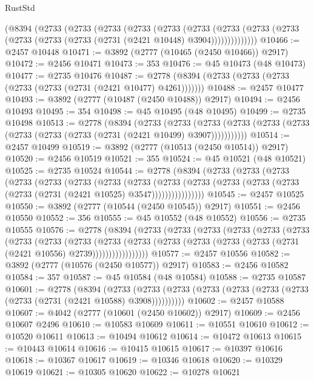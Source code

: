 \begin{lexlean}{RustStd}
\begin{coremodule}
    (@8394
      (@2733
        (@2733
          (@2733
            (@2733
              (@2733
                (@2733
                  (@2733
                    (@2733 (@2733 (@2733 (@2733 (@2733 (@2731 (@2421 @10448) @3904))))))))))))))
@10466 := @2457 @10448
@10471 := @3892 (@2777 (@10465 (@2450 @10466)) @2917)
@10472 := @2456 @10471
@10473 := 353
@10476 := @45 @10473 (@48 @10473)
@10477 := @2735 @10476
@10487 := @2778 (@8394 (@2733 (@2733 (@2733 (@2733 (@2733 (@2731 (@2421 @10477) @4261)))))))
@10488 := @2457 @10477
@10493 := @3892 (@2777 (@10487 (@2450 @10488)) @2917)
@10494 := @2456 @10493
@10495 := 354
@10498 := @45 @10495 (@48 @10495)
@10499 := @2735 @10498
@10513 := @2778
    (@8394
      (@2733
        (@2733
          (@2733 (@2733 (@2733 (@2733 (@2733 (@2733 (@2733 (@2731 (@2421 @10499) @3907)))))))))))
@10514 := @2457 @10499
@10519 := @3892 (@2777 (@10513 (@2450 @10514)) @2917)
@10520 := @2456 @10519
@10521 := 355
@10524 := @45 @10521 (@48 @10521)
@10525 := @2735 @10524
@10544 := @2778
    (@8394
      (@2733
        (@2733
          (@2733
            (@2733
              (@2733
                (@2733
                  (@2733
                    (@2733
                      (@2733
                        (@2733
                          (@2733 (@2733 (@2733 (@2733 (@2731 (@2421 @10525) @3547))))))))))))))))
@10545 := @2457 @10525
@10550 := @3892 (@2777 (@10544 (@2450 @10545)) @2917)
@10551 := @2456 @10550
@10552 := 356
@10555 := @45 @10552 (@48 @10552)
@10556 := @2735 @10555
@10576 := @2778
    (@8394
      (@2733
        (@2733
          (@2733
            (@2733
              (@2733
                (@2733
                  (@2733
                    (@2733
                      (@2733
                        (@2733
                          (@2733
                            (@2733 (@2733 (@2733 (@2733 (@2731 (@2421 @10556) @2739)))))))))))))))))
@10577 := @2457 @10556
@10582 := @3892 (@2777 (@10576 (@2450 @10577)) @2917)
@10583 := @2456 @10582
@10584 := 357
@10587 := @45 @10584 (@48 @10584)
@10588 := @2735 @10587
@10601 := @2778
    (@8394
      (@2733 (@2733 (@2733 (@2733 (@2733 (@2733 (@2733 (@2733 (@2731 (@2421 @10588) @3908))))))))))
@10602 := @2457 @10588
@10607 := @4042 (@2777 (@10601 (@2450 @10602)) @2917)
@10609 := @2456 @10607 @2496
@10610 := @10583 @10609
@10611 := @10551 @10610
@10612 := @10520 @10611
@10613 := @10494 @10612
@10614 := @10472 @10613
@10615 := @10443 @10614
@10616 := @10415 @10615
@10617 := @10397 @10616
@10618 := @10367 @10617
@10619 := @10346 @10618
@10620 := @10329 @10619
@10621 := @10305 @10620
@10622 := @10278 @10621

\end{coremodule}
\end{lexlean}
